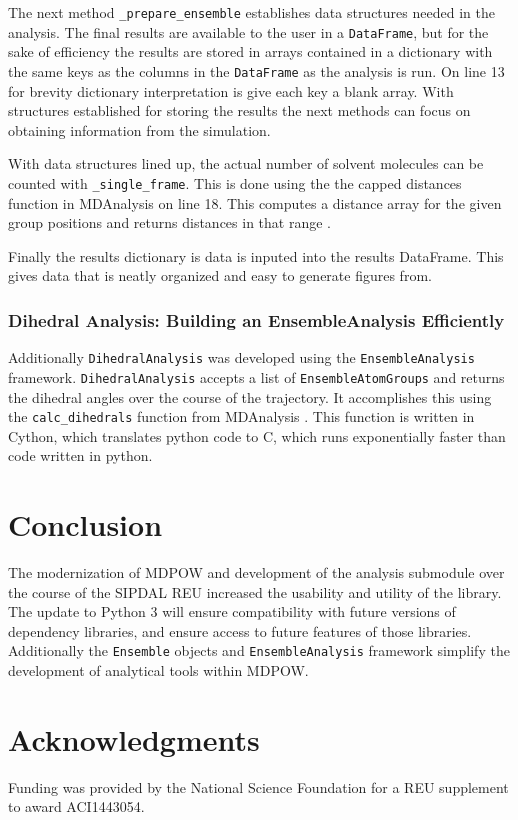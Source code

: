 \documentclass{article}[letterpaper, margins=1in, 12pt]
\begin{document}
The next method \lstinline{_prepare_ensemble} establishes data structures needed in the analysis. The final results are available to the user in a \texttt{DataFrame}, but for the sake of efficiency the results are stored in arrays contained in a dictionary with the same keys as the columns in the \texttt{DataFrame} as the analysis is run. On line 13 for brevity dictionary interpretation is give each key a blank array.  With structures established for storing the results the next methods can focus on obtaining information from the simulation.

With data structures lined up, the actual number of solvent molecules can be counted with \lstinline{_single_frame}. This is done using the the capped distances function in MDAnalysis on line 18. This computes a distance array for the given group positions and returns distances in that range \cite{michaud-agrawal_mdanalysis_2011, gowers_mdanalysis_2016}.

Finally the results dictionary is data is inputed into the results DataFrame. This gives data that is neatly organized and easy to generate figures from.

\subsubsection{Dihedral Analysis: Building an EnsembleAnalysis Efficiently}
Additionally \texttt{DihedralAnalysis} was developed using the \texttt{EnsembleAnalysis} framework. \texttt{DihedralAnalysis} accepts a list of \texttt{EnsembleAtomGroups} and returns the dihedral angles over the course of the trajectory. It accomplishes this using the \lstinline{calc_dihedrals} function from MDAnalysis \cite{michaud-agrawal_mdanalysis_2011, gowers_mdanalysis_2016}. This function is written in Cython, which translates python code to C, which runs exponentially faster than code written in python. 

\section{Conclusion}
The modernization of MDPOW and development of the analysis submodule over the course of the SIPDAL REU increased the usability and utility of the library. The update to Python 3 will ensure compatibility with future versions of dependency libraries, and ensure access to future features of those libraries. Additionally the \texttt{Ensemble} objects and \texttt{EnsembleAnalysis} framework simplify the development of analytical tools within MDPOW.

\section*{Acknowledgments}
Funding was provided by the National Science Foundation for a REU supplement to award ACI1443054. 

\printbibliography
\end{document}
